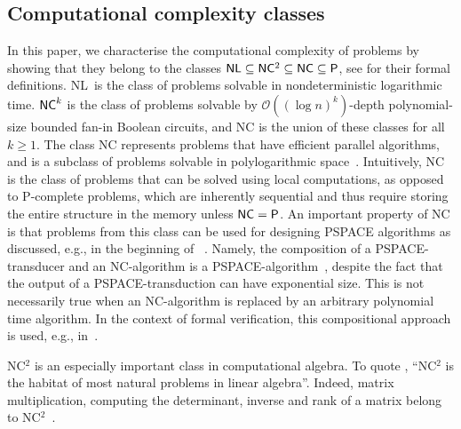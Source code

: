 \documentclass[11pt,a4paper]{amsart}
\newcommand{\OO}{\mathcal{O}}
\newcommand{\NCT}{\textnormal{\textsf{NC$^2$}}\xspace}
\newcommand{\NC}{\textnormal{\textsf{NC}}\xspace}
\newcommand{\PSPACE}{\textnormal{\textsf{PSPACE}}\xspace}
\newcommand{\NL}
{\textnormal{\textsf{NL}}\xspace}
\newcommand{\PTIME}{\textnormal{\textsf{P}}\xspace}
\theoremstyle{plain}
\theoremstyle{definition}
\theoremstyle{defC}
\theoremstyle{thmC}
\theoremstyle{plain}
\numberwithin{equation}{section}
\begin{document}
\subsection{Computational complexity classes} 
In this paper, we characterise the computational complexity of problems by showing that they belong to the classes $\NL \subseteq \NCT \subseteq \NC \subseteq \PTIME$, see \cite{Arora2009, Goldreich2008} for their formal definitions. \NL~is the class of problems solvable in nondeterministic logarithmic time. $\NC^k$ is the class of problems solvable by $\OO((\log n)^k)$-depth polynomial-size bounded fan-in Boolean circuits, and \NC is the union of these classes for all $k \ge 1$.
The class \NC represents problems that have efficient parallel algorithms, and is a subclass of problems solvable in polylogarithmic space~\cite{Arora2009}. Intuitively, \NC is the class of problems that can be solved using local computations, as opposed to \PTIME-complete problems, which are inherently sequential and thus require storing the entire structure in the memory unless $\NC = \PTIME$. An important property of \NC is that problems from this class can be used for designing \PSPACE algorithms as discussed, e.g., in the beginning of ~\cite[Section 3]{Jain2011}. Namely, the  composition of a \PSPACE-transducer and an \NC-algorithm is a \PSPACE-algorithm~\cite{Borodin1977}, despite the fact that the output of a \PSPACE-transduction can have exponential size. This is not necessarily true when an \NC-algorithm is replaced by an arbitrary polynomial time algorithm. In the context of formal verification, this compositional approach is used, e.g., in~\cite{Baier2023}.


\enlargethispage{2\baselineskip}
\NCT is an especially important class in computational algebra.
To quote \cite[page 468]{Goldreich2008}, ``\NCT is the habitat of most natural problems in linear algebra''. Indeed, matrix multiplication, computing the determinant, inverse and rank of a matrix belong to \NCT~\cite{BorodinGH82,Cook85,Berkowitz1984,Csanky1976}.
\end{document}
